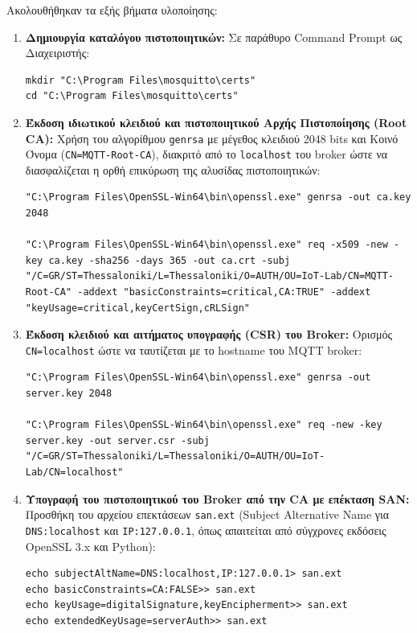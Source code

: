 \documentclass[11pt, a4paper]{article}
\begin{document}
Ακολουθήθηκαν τα εξής βήματα υλοποίησης:
\begin{enumerate}
    \item \textbf{Δημιουργία καταλόγου πιστοποιητικών:} Σε παράθυρο Command Prompt ως Διαχειριστής:
\begin{lstlisting}[language={}]
mkdir "C:\Program Files\mosquitto\certs"
cd "C:\Program Files\mosquitto\certs"
\end{lstlisting}
    \item \textbf{Έκδοση ιδιωτικού κλειδιού και πιστοποιητικού Αρχής Πιστοποίησης (Root CA):} Χρήση του αλγορίθμου \texttt{genrsa} με μέγεθος κλειδιού 2048 bits και Κοινό Όνομα (\texttt{CN=MQTT-Root-CA}), διακριτό από το \texttt{localhost} του broker ώστε να διασφαλίζεται η ορθή επικύρωση της αλυσίδας πιστοποιητικών:
\begin{lstlisting}[language={}]
"C:\Program Files\OpenSSL-Win64\bin\openssl.exe" genrsa -out ca.key 2048

"C:\Program Files\OpenSSL-Win64\bin\openssl.exe" req -x509 -new -key ca.key -sha256 -days 365 -out ca.crt -subj "/C=GR/ST=Thessaloniki/L=Thessaloniki/O=AUTH/OU=IoT-Lab/CN=MQTT-Root-CA" -addext "basicConstraints=critical,CA:TRUE" -addext "keyUsage=critical,keyCertSign,cRLSign"
\end{lstlisting}
    \item \textbf{Έκδοση κλειδιού και αιτήματος υπογραφής (CSR) του Broker:} Ορισμός \texttt{CN=localhost} ώστε να ταυτίζεται με το hostname του MQTT broker:
\begin{lstlisting}[language={}]
"C:\Program Files\OpenSSL-Win64\bin\openssl.exe" genrsa -out server.key 2048

"C:\Program Files\OpenSSL-Win64\bin\openssl.exe" req -new -key server.key -out server.csr -subj "/C=GR/ST=Thessaloniki/L=Thessaloniki/O=AUTH/OU=IoT-Lab/CN=localhost"
\end{lstlisting}
    \item \textbf{Υπογραφή του πιστοποιητικού του Broker από την CA με επέκταση SAN:} Προσθήκη του αρχείου επεκτάσεων \texttt{san.ext} (Subject Alternative Name για \texttt{DNS:localhost} και \texttt{IP:127.0.0.1}, όπως απαιτείται από σύγχρονες εκδόσεις OpenSSL 3.x και Python):
\begin{lstlisting}[language={}]
echo subjectAltName=DNS:localhost,IP:127.0.0.1> san.ext
echo basicConstraints=CA:FALSE>> san.ext
echo keyUsage=digitalSignature,keyEncipherment>> san.ext
echo extendedKeyUsage=serverAuth>> san.ext


\end{lstlisting}
\end{enumerate}
\end{document}
